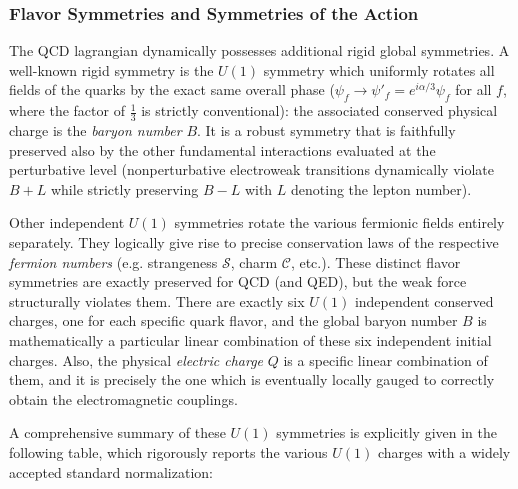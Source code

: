\subsubsection{Flavor Symmetries and Symmetries of the Action}

The QCD lagrangian dynamically possesses additional rigid global symmetries. A well-known rigid symmetry is the \(U(1)\) symmetry which uniformly rotates all fields of the quarks by the exact same overall phase (\(\psi_f \rightarrow \psi'_f = e^{i\alpha/3}\psi_f\) for all \(f\), where the factor of \(\frac{1}{3}\) is strictly conventional): the associated conserved physical charge is the \textit{baryon number} \(B\). It is a robust symmetry that is faithfully preserved also by the other fundamental interactions evaluated at the perturbative level (nonperturbative electroweak transitions dynamically violate \(B+L\) while strictly preserving \(B-L\) with \(L\) denoting the lepton number).

Other independent \(U(1)\) symmetries rotate the various fermionic fields entirely separately. They logically give rise to precise conservation laws of the respective \textit{fermion numbers} (e.g. strangeness \(\mathcal{S}\), charm \(\mathcal{C}\), etc.). These distinct flavor symmetries are exactly preserved for QCD (and QED), but the weak force structurally violates them. There are exactly six \(U(1)\) independent conserved charges, one for each specific quark flavor, and the global baryon number \(B\) is mathematically a particular linear combination of these six independent initial charges. Also, the physical \textit{electric charge} \(Q\) is a specific linear combination of them, and it is precisely the one which is eventually locally gauged to correctly obtain the electromagnetic couplings.

A comprehensive summary of these \(U(1)\) symmetries is explicitly given in the following table, which rigorously reports the various \(U(1)\) charges with a widely accepted standard normalization:


